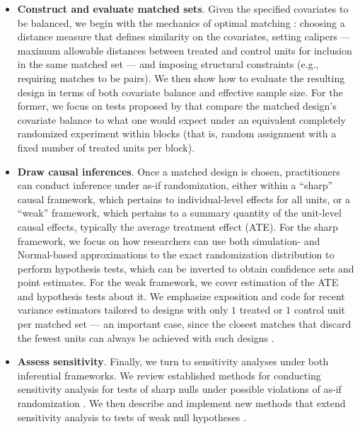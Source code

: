 \documentclass[
  12pt,
  leqno]{article}
\begin{document}
\begin{itemize}
\item
  \textbf{Construct and evaluate matched sets}. Given the specified
  covariates to be balanced, we begin with the mechanics of optimal
  matching \citep{hansen2004, hansenklopfer2006}: choosing a distance
  measure that defines similarity on the covariates, setting calipers
  --- maximum allowable distances between treated and control units for
  inclusion in the same matched set --- and imposing structural
  constraints (e.g., requiring matches to be pairs). We then show how to
  evaluate the resulting design in terms of both covariate balance and
  effective sample size. For the former, we focus on tests proposed by
  \citet{hansenbowers2008} that compare the matched design's covariate
  balance to what one would expect under an equivalent completely
  randomized experiment within blocks (that is, random assignment with a
  fixed number of treated units per block).
\item
  \textbf{Draw causal inferences}. Once a matched design is chosen,
  practitioners can conduct inference under as-if randomization, either
  within a ``sharp'' causal framework, which pertains to
  individual-level effects for all units, or a ``weak'' framework, which
  pertains to a summary quantity of the unit-level causal effects,
  typically the average treatment effect (ATE). For the sharp framework,
  we focus on how researchers can use both simulation- and Normal-based
  approximations to the exact randomization distribution to perform
  hypothesis tests, which can be inverted to obtain confidence sets and
  point estimates. For the weak framework, we cover estimation of the
  ATE and hypothesis tests about it. We emphasize exposition and code
  for recent variance estimators tailored to designs with only \(1\)
  treated or \(1\) control unit per matched set
  \citep{fogarty2018, pashleymiratrix2021} --- an important case, since
  the closest matches that discard the fewest units can always be
  achieved with such designs
  \citep{gurosenbaum1993, rosenbaum1991, hansen2004, hansen2011}.
\item
  \textbf{Assess sensitivity}. Finally, we turn to sensitivity analyses
  under both inferential frameworks. We review established methods for
  conducting sensitivity analysis for tests of sharp nulls under
  possible violations of as-if randomization
  \citep{rosenbaumkrieger1990, gastwirthetal2000, rosenbaum2018}. We
  then describe and implement new methods that extend sensitivity
  analysis to tests of weak null hypotheses \citep{fogarty2023}.
\end{itemize}
\end{document}
